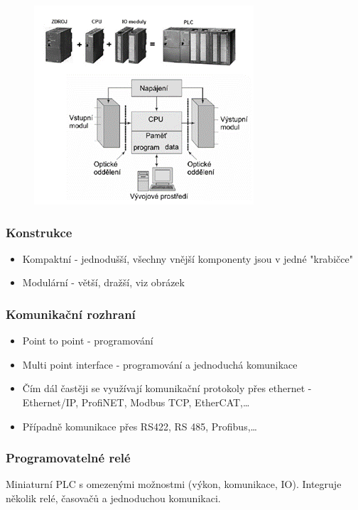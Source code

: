 \begin{figure}[h]
  \begin{center}
    \includegraphics[scale = 1]{img/Picture13.png}
  \end{center}
\end{figure}

\subsubsection*{Konstrukce}
\begin{itemize}
  \item Kompaktní - jednodušší, všechny vnější komponenty jsou v jedné "krabičce"
  \item Modulární - větší, dražší, viz obrázek
\end{itemize}

\subsubsection*{Komunikační rozhraní}
\begin{itemize}
  \item Point to point - programování
  \item Multi point interface - programování a jednoduchá komunikace
  \item Čím dál častěji se využívají komunikační protokoly přes ethernet - Ethernet/IP, ProfiNET, Modbus TCP, EtherCAT,\dots
  \item Případně komunikace přes RS422, RS 485, Profibus,\dots
\end{itemize}

\subsubsection*{Programovatelné relé}
Miniaturní PLC s omezenými možnostmi (výkon, komunikace, IO). Integruje několik relé, časovačů a jednoduchou komunikaci.

